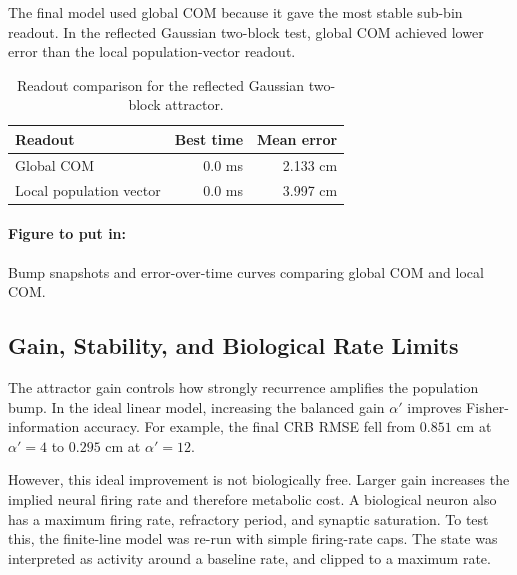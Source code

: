 The final model used global COM because it gave the most stable sub-bin readout. In the reflected Gaussian two-block test, global COM achieved lower error than the local population-vector readout.

\begin{table}[htbp]
    \centering
    \caption{Readout comparison for the reflected Gaussian two-block attractor.}
    \label{tab:cann_readout_comparison}
    \begin{tabular}{lrr}
        \toprule
        \textbf{Readout} & \textbf{Best time} & \textbf{Mean error} \\
        \midrule
        Global COM & 0.0 ms & 2.133 cm \\
        Local population vector & 0.0 ms & 3.997 cm \\
        \bottomrule
    \end{tabular}
\end{table}

\paragraph{Figure to put in:} Bump snapshots and error-over-time curves comparing global COM and local COM.

\subsection{Gain, Stability, and Biological Rate Limits}

The attractor gain controls how strongly recurrence amplifies the population bump. In the ideal linear model, increasing the balanced gain $\alpha'$ improves Fisher-information accuracy. For example, the final CRB RMSE fell from $0.851$ cm at $\alpha'=4$ to $0.295$ cm at $\alpha'=12$.

However, this ideal improvement is not biologically free. Larger gain increases the implied neural firing rate and therefore metabolic cost. A biological neuron also has a maximum firing rate, refractory period, and synaptic saturation. To test this, the finite-line model was re-run with simple firing-rate caps. The state was interpreted as activity around a baseline rate, and clipped to a maximum rate.

